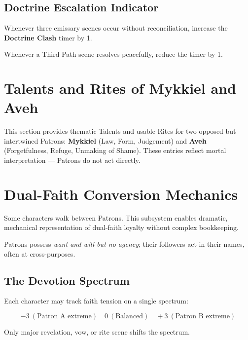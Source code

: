 \documentclass[11pt]{article}
\begin{document}
\subsection{Doctrine Escalation Indicator}

Whenever three emissary scenes occur without reconciliation,
increase the \textbf{Doctrine Clash} timer by 1.

Whenever a Third Path scene resolves peacefully, reduce the timer by 1.

\section{Talents and Rites of Mykkiel and Aveh}
\label{sec:patronTalentsAvehMykkiel}

This section provides thematic Talents and usable Rites for two opposed
but intertwined Patrons: \textbf{Mykkiel} (Law, Form, Judgement) and
\textbf{Aveh} (Forgetfulness, Refuge, Unmaking of Shame). These entries
reflect mortal interpretation --- Patrons do not act directly.
\section{Dual-Faith Conversion Mechanics}
\label{sec:dualFaith}

Some characters walk between Patrons. This subsystem enables dramatic,
mechanical representation of dual-faith loyalty without complex bookkeeping.

Patrons possess \emph{want and will but no agency}; their followers act in
their names, often at cross-purposes.

\subsection{The Devotion Spectrum}

Each character may track faith tension on a single spectrum:

\[
-3 \ (\text{Patron A extreme}) \quad
0 \ (\text{Balanced}) \quad
+3 \ (\text{Patron B extreme})
\]

\noindent
Only major revelation, vow, or rite scene shifts the spectrum.
\end{document}
